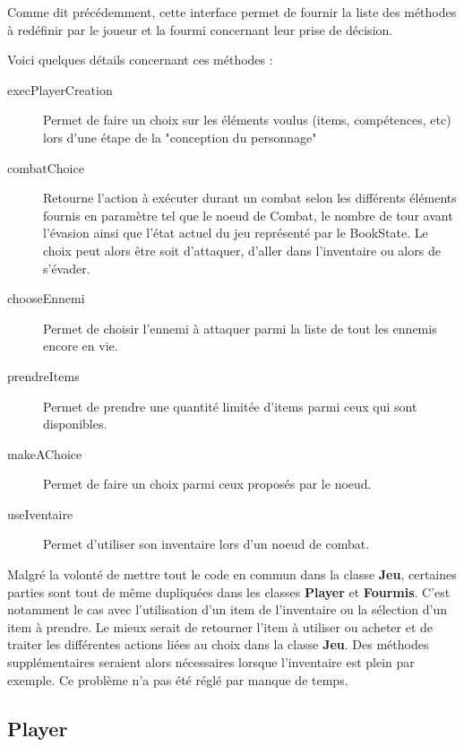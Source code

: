 			Comme dit précédemment, cette interface permet de fournir la liste des méthodes à redéfinir par le joueur et la fourmi concernant leur prise de décision.

			Voici quelques détails concernant ces méthodes :

			\begin{description}
				\item[execPlayerCreation]{Permet de faire un choix sur les éléments voulus (items, compétences, etc) lors d'une étape de la "conception du personnage"}

				\item[combatChoice]{Retourne l'action à exécuter durant un combat selon les différents éléments fournis en paramètre tel que le noeud de Combat, le nombre de tour avant l'évasion ainsi que l'état actuel du jeu représenté par le BookState. Le choix peut alors être soit d'attaquer, d'aller dans l'inventaire ou alors de s'évader.}

				\item[chooseEnnemi]{Permet de choisir l'ennemi à attaquer parmi la liste de tout les ennemis encore en vie.}

				\item[prendreItems]{Permet de prendre une quantité limitée d'items parmi ceux qui sont disponibles.}

				\item[makeAChoice]{Permet de faire un choix parmi ceux proposés par le noeud.}

				\item[useIventaire]{Permet d'utiliser son inventaire lors d'un noeud de combat.}
			\end{description}

			Malgré la volonté de mettre tout le code en commun dans la classe \textbf{Jeu}, certaines parties sont tout de même dupliquées dans les classes \textbf{Player} et \textbf{Fourmis}. C'est notamment le cas avec l'utilisation d'un item de l'inventaire ou la sélection d'un item à prendre. Le mieux serait de retourner l'item à utiliser ou acheter et de traiter les différentes actions liées au choix dans la classe \textbf{Jeu}. Des méthodes supplémentaires seraient alors nécessaires lorsque l'inventaire est plein par exemple. Ce problème n'a pas été réglé par manque de temps.

		\subsection{Player}
			\label{subsec:player}

